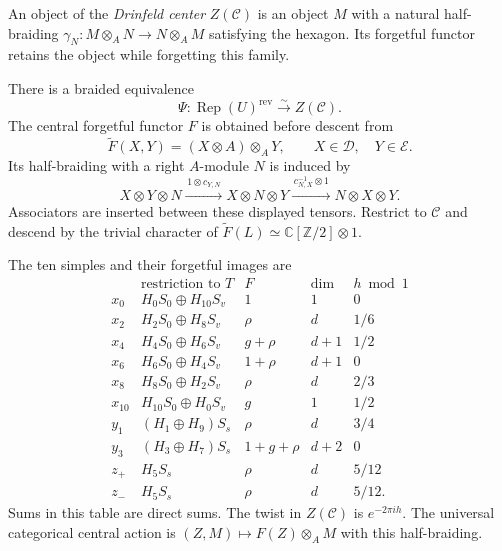 An object of the \emph{Drinfeld center} $Z(\mathcal C)$
is an object $M$ with a natural half-braiding
$\gamma_N:M\otimes_A N\to N\otimes_A M$
satisfying the hexagon. Its forgetful functor retains
the object while forgetting this family.

\begin{theorem}
\label{v4-arith:centers:thm:e6-center}
There is a braided equivalence
\[
 \Psi:\operatorname{Rep}(U)^{\mathrm{rev}}
 \xrightarrow{\sim}Z(\mathcal C).
\]
The central forgetful functor $F$ is obtained before descent
from
\[
 \widetilde F(X,Y)=(X\otimes A)\otimes_A Y,
 \qquad X\in\mathcal D,\quad Y\in\mathcal E.
\]
Its half-braiding with a right $A$-module $N$ is induced by
\[
 X\otimes Y\otimes N
 \xrightarrow{\,1\otimes c_{Y,N}\,}X\otimes N\otimes Y
 \xrightarrow{\,c_{N,X}^{-1}\otimes1\,}N\otimes X\otimes Y.
\]
Associators are inserted between these displayed tensors.
Restrict to $\mathcal C$ and descend by the trivial character
of $\widetilde F(L)\simeq\mathbb C[\mathbb Z/2]\otimes1$.

The ten simples and their forgetful images are
\[
\begin{array}{c|c|c|c|c}
 &\text{restriction to }T&F&\dim&h\bmod1\\ \hline
 x_0&H_0S_0\oplus H_{10}S_v&1&1&0\\
 x_2&H_2S_0\oplus H_8S_v&\rho&d&1/6\\
 x_4&H_4S_0\oplus H_6S_v&g+\rho&d+1&1/2\\
 x_6&H_6S_0\oplus H_4S_v&1+\rho&d+1&0\\
 x_8&H_8S_0\oplus H_2S_v&\rho&d&2/3\\
 x_{10}&H_{10}S_0\oplus H_0S_v&g&1&1/2\\
 y_1&(H_1\oplus H_9)S_s&\rho&d&3/4\\
 y_3&(H_3\oplus H_7)S_s&1+g+\rho&d+2&0\\
 z_+&H_5S_s&\rho&d&5/12\\
 z_-&H_5S_s&\rho&d&5/12 .
\end{array}
\]
Sums in this table are direct sums.
The twist in $Z(\mathcal C)$ is $e^{-2\pi i h}$.
The universal categorical central action is
$(Z,M)\mapsto F(Z)\otimes_A M$ with this half-braiding.
\end{theorem}

